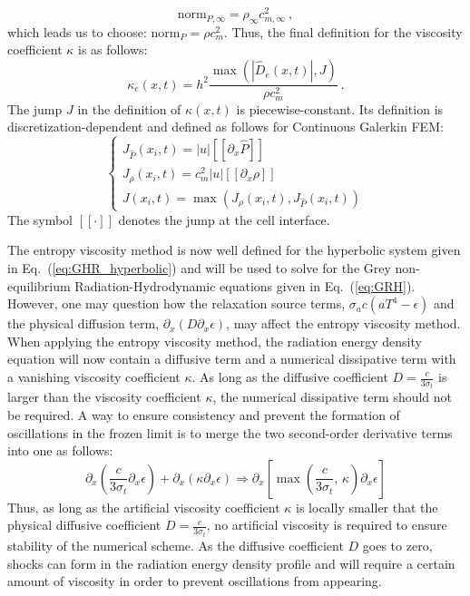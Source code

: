 \documentclass[review]{elsarticle}
\newcommand{\eqt}[1]{Eq.~(\ref{#1})}                     %
\newcommand{\norm}{\textrm{norm}}
\begin{document}
%
\begin{equation}
\norm_{P,\infty} = \rho_\infty c^2_{m,\infty} \nonumber \ ,
\end{equation}
%
which leads us to choose: $\norm_P = \rho c_m^2$. Thus, the final definition for the viscosity coefficient $\kappa$ is as follows:
\begin{equation}
\label{eq:equation12bis}
\kappa_e(x,t) = h^2 \frac{\max (|\hat{D}_e(x,t)|, J)}{\rho c_m^2} \ .
\end{equation} 
The jump $J$ in the definition of $\kappa(x,t)$ is piecewise-constant. Its definition is discretization-dependent and defined as follows for Continuous Galerkin FEM: 
\begin{equation}
\label{eq:equation12ter}
\left\{
\begin{array}{lll}
J_{\hat{P}}(x_i,t) = |u| [[\partial_x \hat{P}]]\\
J_{\rho}(x_i,t) = c_m^2 |u|  [[\partial_x \rho]] \\
J(x_i,t) = \max( J_{\rho}(x_i,t), J_{\hat{P}}(x_i,t) )
\end{array}
\right.
\end{equation}
The symbol $[[ \cdot ]]$ denotes the jump at the cell interface.

The entropy viscosity method is now well defined for the hyperbolic system given in \eqt{eq:GHR_hyperbolic} and will be used to solve for the Grey non-equilibrium Radiation-Hydrodynamic equations given in \eqt{eq:GRH}. However, one may question how the relaxation source terms, $\sigma_a c (a T^4-\epsilon)$ and the physical diffusion term, $\partial_x(D\partial_x \epsilon)$, may affect the entropy viscosity method. When applying the entropy viscosity method, the radiation energy density equation will now contain a diffusive term and a numerical dissipative term with a vanishing viscosity coefficient $\kappa$. As long as the diffusive coefficient $D=\frac{c}{3 \sigma_t}$ is larger than the viscosity coefficient $\kappa$, the numerical dissipative term should not be required. A way to ensure consistency and prevent the formation of oscillations in the frozen limit is to merge the two second-order derivative terms into one as follows:
\begin{equation}
 \partial_x \left( \frac{c}{3 \sigma_t} \partial_x \epsilon \right) + \partial_x \left( \kappa \partial_x \epsilon \right) 
 \Longrightarrow
 \partial_x \left[ \max\left(\frac{c}{3 \sigma_t} \text{, } \kappa \right) \partial_x \epsilon \right]
\end{equation}
Thus, as long as the artificial viscosity coefficient $\kappa$ is locally smaller that the physical diffusive coefficient $D=\frac{c}{3 \sigma_t}$, no artificial viscosity is required to ensure stability of the numerical scheme. As the diffusive coefficient $D$ goes to zero, shocks can form in the radiation energy density profile and will require a certain amount of viscosity in order to prevent oscillations from appearing.
\end{document}
